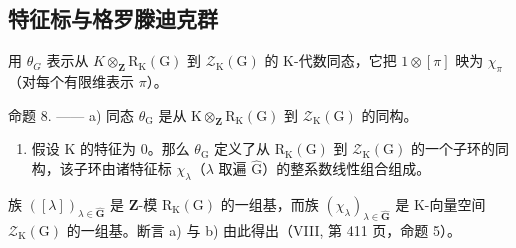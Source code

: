 \subsection{特征标与格罗滕迪克群}

用 \(\theta_{G}\) 表示从 \(K\otimes_{\mathbf{Z}}\mathrm{R}_{\mathrm{K}}(\mathrm{G})\) 到 \(\mathcal{Z}_{\mathrm{K}}(\mathrm{G})\) 的 K-代数同态，它把 \(1\otimes[\pi]\) 映为 \(\chi_{\pi}\)（对每个有限维表示 \(\pi\)）。

命题 8. —— a) 同态 \(\theta_{\mathrm{G}}\) 是从 \(\mathrm{K} \otimes_{\mathbf{Z}} \mathrm{R}_{\mathrm{K}}(\mathrm{G})\) 到 \(\mathcal{Z}_{\mathrm{K}}(\mathrm{G})\) 的同构。

\begin{enumerate}
\def\labelenumi{\alph{enumi})}
\setcounter{enumi}{1}
\tightlist
\item
  假设 K 的特征为 0。那么 \(\theta_{\mathrm{G}}\) 定义了从 \(\mathrm{R}_{\mathrm{K}}(\mathrm{G})\) 到 \(\mathcal{Z}_{\mathrm{K}}(\mathrm{G})\) 的一个子环的同构，该子环由诸特征标 \(\chi_{\lambda}\)（\(\lambda\) 取遍 \(\widehat{\mathrm{G}}\)）的整系数线性组合组成。
\end{enumerate}

族 \(([\lambda])_{\lambda \in \widehat{\mathbf{G}}}\) 是 \(\mathbf{Z}\)-模 \(\mathrm{R}_{\mathrm{K}}(\mathrm{G})\) 的一组基，而族 \((\chi_{\lambda})_{\lambda \in \widehat{\mathbf{G}}}\) 是 K-向量空间 \(\mathcal{Z}_{\mathrm{K}}(\mathrm{G})\) 的一组基。断言 a) 与 b) 由此得出（VIII, 第 411 页，命题 5）。

